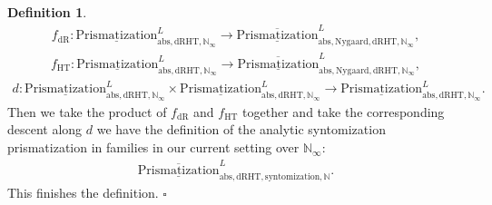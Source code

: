 \documentclass[12pt]{article}
\theoremstyle{definition}
\newtheorem{definition}{Definition}
\begin{document}
\begin{definition}
\begin{align}
f_\mathrm{dR}: {\underline{\mathrm{Prismatization}}}^L_{\mathrm{abs},\mathrm{dRHT},\mathbb{N}_\infty}\rightarrow \overline{\underline{\mathrm{Prismatization}}}^L_{\mathrm{abs},\mathrm{Nygaard},\mathrm{dRHT},\mathbb{N}_\infty},
\end{align}
\begin{align}
f_\mathrm{HT}: {\underline{\mathrm{Prismatization}}}^L_{\mathrm{abs},\mathrm{dRHT},\mathbb{N}_\infty}\rightarrow \overline{\underline{\mathrm{Prismatization}}}^L_{\mathrm{abs},\mathrm{Nygaard},\mathrm{dRHT},\mathbb{N}_\infty},
\end{align}
\begin{align}
d:  {\underline{\mathrm{Prismatization}}}^L_{\mathrm{abs},\mathrm{dRHT},\mathbb{N}_\infty}\times {\underline{\mathrm{Prismatization}}}^L_{\mathrm{abs},\mathrm{dRHT},\mathbb{N}_\infty} \rightarrow {\underline{\mathrm{Prismatization}}}^L_{\mathrm{abs},\mathrm{dRHT},\mathbb{N}_\infty}.
\end{align}
Then we take the product of $f_\mathrm{dR}$ and $f_\mathrm{HT}$ together and take the corresponding descent along $d$ we have the definition of the analytic syntomization prismatization in families in our current setting over $\mathbb{N}_\infty$:
\begin{align}
\overline{\underline{\mathrm{Prismatization}}}^L_{\mathrm{abs},\mathrm{dRHT},\mathrm{syntomization},\mathbb{N}}. 
\end{align}
This finishes the definition. $\square$
\end{definition}
\end{document}
